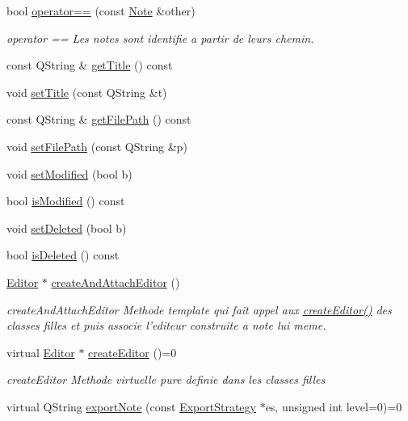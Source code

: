 \begin{DoxyCompactItemize}
bool \hyperlink{class_note_a6e477898ff4b6ac3c14abf80d6d8ba41}{operator==} (const \hyperlink{class_note}{Note} \&other)
\begin{DoxyCompactList}\small\item\em operator == Les notes sont identifie a partir de leurs chemin. \end{DoxyCompactList}\item 
const Q\-String \& \hyperlink{class_note_ac5891af072f8e8d990909a65c0702244}{get\-Title} () const 
\item 
void \hyperlink{class_note_a7a9ca310664f058b56ccc33005688e25}{set\-Title} (const Q\-String \&t)
\item 
const Q\-String \& \hyperlink{class_note_a41b62e8cf9f5d07753850eb7821f1e2c}{get\-File\-Path} () const 
\item 
void \hyperlink{class_note_a59d6698a57f3a5fedff8aed7efe13524}{set\-File\-Path} (const Q\-String \&p)
\item 
void \hyperlink{class_note_a96987169db4b02ff6b82696cb7bdaa11}{set\-Modified} (bool b)
\item 
bool \hyperlink{class_note_abe3ea587b0371292768ce5b6cccfc796}{is\-Modified} () const 
\item 
void \hyperlink{class_note_a7c8886e32496439d9c19a5848a085d73}{set\-Deleted} (bool b)
\item 
bool \hyperlink{class_note_a6a86277323d886247480eca23be9df22}{is\-Deleted} () const 
\item 
\hyperlink{class_editor}{Editor} $\ast$ \hyperlink{class_note_a5d4e5449f72f48c9385c195415fa5843}{create\-And\-Attach\-Editor} ()
\begin{DoxyCompactList}\small\item\em create\-And\-Attach\-Editor Methode template qui fait appel aux \hyperlink{class_note_a6fab406019fac776671ce73b541afa67}{create\-Editor()} des classes filles et puis associe l'editeur construite a note lui meme. \end{DoxyCompactList}\item 
virtual \hyperlink{class_editor}{Editor} $\ast$ \hyperlink{class_note_a6fab406019fac776671ce73b541afa67}{create\-Editor} ()=0
\begin{DoxyCompactList}\small\item\em create\-Editor Methode virtuelle pure definie dans les classes filles \end{DoxyCompactList}\item 
virtual Q\-String \hyperlink{class_note_aa0ba654b756800042d3022d0dcd21ef8}{export\-Note} (const \hyperlink{class_export_strategy}{Export\-Strategy} $\ast$es, unsigned int level=0)=0

\end{DoxyCompactItemize}
